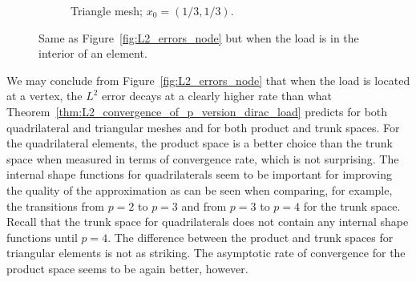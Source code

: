 \documentclass[english, 12pt, a4paper, sci, utf8, a-2b, online]{aaltothesis}
\theoremstyle{definition}
\theoremstyle{plain}
\numberwithin{equation}{section}
\begin{document}
\begin{figure}[t]
\begin{subfigure}[t]{0.475\textwidth}
        \caption{Triangle mesh; $x_0 = (1/3,1/3)$.}
        \label{fig:L2_errors_int_b}
    \end{subfigure}
    \caption{Same as Figure~\ref{fig:L2_errors_node} but when the load is in the interior of an element.}
    \label{fig:L2_errors_int}
\end{figure}

We may conclude from Figure~\ref{fig:L2_errors_node} that
when the load is located at a vertex, the $L^2$ error decays at a clearly higher rate
than what Theorem~\ref{thm:L2_convergence_of_p_version_dirac_load} predicts
for both quadrilateral and triangular meshes and for both product and trunk spaces.
For the quadrilateral elements, the product space is a better choice than the trunk space
when measured in terms of convergence rate, which is not surprising.
The internal shape functions for quadrilaterals seem to be important for improving the
quality of the approximation as can be seen when comparing, for example, the
transitions from $p=2$ to $p=3$ and from $p=3$ to $p=4$ for the trunk space.
Recall that the trunk space for quadrilaterals does not contain any internal shape functions
until $p=4$. The difference between the product and trunk spaces for triangular elements
is not as striking. The asymptotic rate of convergence for the product space
seems to be again better, however.
\end{document}
